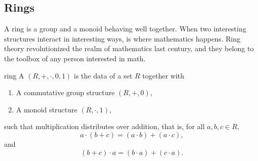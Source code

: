 
\subsection{Rings}

A ring is a group and a monoid behaving well together. When two interesting structures interact in interesting ways, is where mathematics happens. Ring theory revolutionized the realm of mathematics last century, and they belong to the toolbox of any person interested in math.

\begin{cdef}{}{ring}
    A  \( (R, +, \cdot, 0, 1) \) is the data of a set \( R \) together with
    \begin{enumerate}
        \item A commutative group structure \( (R, +, 0) \),
        \item A monoid structure \( (R, \cdot, 1) \),
    \end{enumerate}
    such that multiplication distributes over addition, that is, for all \( a, b, c \in R \),
    \begin{equation*}
        a \cdot(b + c) = (a \cdot b) + (a \cdot c),
    \end{equation*}
    and
    \begin{equation*}
        (b + c)\cdot a = (b \cdot a) + (c \cdot a).
    \end{equation*}
\end{cdef}

